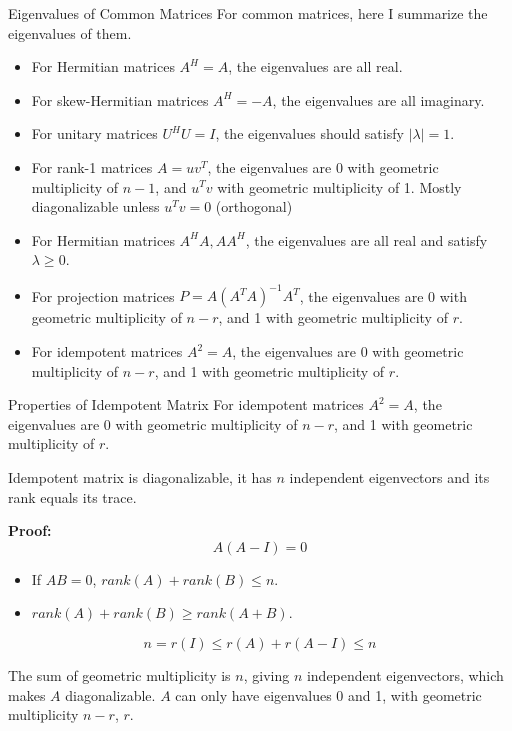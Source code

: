 \documentclass{beamer}
\begin{document}
\begin{frame}{Eigenvalues of Common Matrices}
For common matrices, here I summarize the eigenvalues of them.
\begin{itemize}
    \item For Hermitian matrices $A^H=A$, the eigenvalues are all real.
    \item For skew-Hermitian matrices $A^H=-A$, the eigenvalues are all imaginary.
    \item For unitary matrices $U^HU=I$, the eigenvalues should satisfy $|\lambda|=1$.
    \item For rank-1 matrices $A=uv^T$, the eigenvalues are 0 with geometric multiplicity of $n-1$, and $u^Tv$ with geometric multiplicity of 1. Mostly diagonalizable unless $u^Tv=0$ (orthogonal)
    \item For Hermitian matrices $A^HA, AA^H$, the eigenvalues are all real and satisfy $\lambda \geq 0$.
    \item For projection matrices $P=A(A^TA)^{-1}A^T$, the eigenvalues are 0 with geometric multiplicity of $n-r$, and 1 with geometric multiplicity of $r$.
    \item For idempotent matrices $A^2=A$, the eigenvalues are 0 with geometric multiplicity of $n-r$, and 1 with geometric multiplicity of $r$.
\end{itemize}
\end{frame}

\begin{frame}{Properties of Idempotent Matrix}
For idempotent matrices $A^2=A$, the eigenvalues are 0 with geometric multiplicity of $n-r$, and 1 with geometric multiplicity of $r$.

\vspace{3pt}
Idempotent matrix is diagonalizable, it has $n$ independent eigenvectors and its rank equals its trace.

\vspace{5pt}

\textbf{Proof:}
\begin{equation*}
    A\left( A-I \right) =0
\end{equation*}

\begin{itemize}
    \item If $AB=0$, $rank(A)+rank(B)\leq n$.
    \item $rank(A)+rank(B)\geq  rank(A+B)$.
\end{itemize}

\begin{equation*}
    n=r\left( I \right) \leqslant r\left( A \right) +r\left( A-I \right) \leqslant n
\end{equation*}

The sum of geometric multiplicity is $n$, giving $n$ independent eigenvectors, which makes $A$ diagonalizable. $A$ can only have eigenvalues 0 and 1, with geometric multiplicity $n-r$, $r$.
\end{frame}
\end{document}
